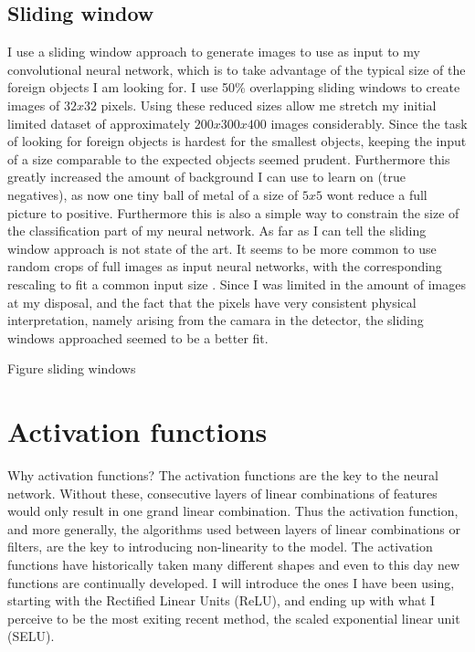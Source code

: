 \subsection{Sliding window}
I use a sliding window approach to generate images to use as input to my convolutional neural network, which is to take advantage of the typical size of the foreign objects I am looking for.
I use 50\% overlapping sliding windows to create images of $32 x 32$ pixels. Using these reduced sizes allow me stretch my initial limited dataset of approximately $200 x 300 x 400$ images considerably. 
Since the task of looking for foreign objects is hardest for the smallest objects, keeping the input of a size comparable to the expected objects seemed prudent. Furthermore this greatly increased the amount of background I can use to learn on (true negatives), as now one tiny ball of metal of a size of $5 x 5$ wont reduce a full picture to positive. Furthermore this is also a simple way to constrain the size of the classification part of my neural network.
As far as I can tell the sliding window approach is not state of the art. It seems to be more common to use random crops of full images as input neural networks, with the corresponding rescaling to fit a common input size .
Since I was limited in the amount of images at my disposal, and the fact that the pixels have very consistent physical interpretation, namely arising from the camara in the detector, the sliding windows approached seemed to be a better fit.
\begin{marginfigure}
  \missingfigure{}%
\caption{Figure sliding windows}
\label{fig.slidingwindows}
\end{marginfigure}

\newpage
\section{Activation functions}
Why activation functions?
The activation functions are the key to the neural network. Without these, consecutive layers of linear combinations of features would only result in one grand linear combination. Thus the activation function, and more generally, the algorithms used between layers of linear combinations or filters, are the key to introducing non-linearity to the model. The activation functions have historically taken many different shapes and even to this day new functions are continually developed. I will introduce the ones I have been using, starting with the Rectified Linear Units\cite{nairRectifiedLinearUnits} (ReLU), and ending up with what I perceive to be the most exiting recent method, the scaled exponential linear unit\cite{klambauerSelfNormalizingNeuralNetworks2017} (SELU).\\

